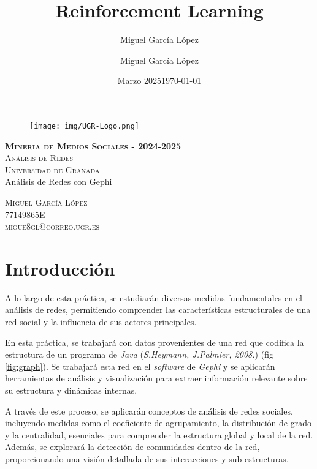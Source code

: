 \documentclass[12pt,letterpaper]{article}
\title{Reinforcement Learning}
\author{Miguel García López}
\date{Marzo 2025}
\author{Miguel García López} %
\date{\normalsize\today} %
\begin{document}
\begin{titlepage}
    \begin{figure}
        \vspace{-1.3cm}
        \begin{center}
            \texttt{[image: img/UGR-Logo.png]}
        \end{center}
    \end{figure}
    \vspace{1.3cm}
    \centering
    \normalfont \normalsize
    \textsc{\textbf{Minería de Medios Sociales - 2024-2025} \\ \vspace{.15cm} Análisis de Redes\\ \vspace{.15cm} Universidad de Granada} \\ [25pt]
    \huge Análisis de Redes con Gephi

    \normalfont \normalsize \vspace{.30cm}
    \textsc{Miguel García López} \\
    \vspace{.15cm}
    \textsc{77149865E} \\
    \vspace{.15cm}
    \textsc{migue8gl@correo.ugr.es}

\end{titlepage}

\tableofcontents
\listoffigures
\listoftables
\newpage

\section{Introducción}
A lo largo de esta práctica, se estudiarán diversas medidas fundamentales en el análisis de redes, permitiendo comprender las características estructurales de una red social y la influencia de sus actores principales.

En esta práctica, se trabajará con datos provenientes de una red que codifica la estructura de un programa de \textit{Java} (\textit{S.Heymann, J.Palmier, 2008.}) (fig \ref{fig:graph}). Se trabajará esta red en el \textit{software} de \textit{Gephi} y se aplicarán herramientas de análisis y visualización para extraer información relevante sobre su estructura y dinámicas internas.

A través de este proceso, se aplicarán conceptos de análisis de redes sociales, incluyendo medidas como el coeficiente de agrupamiento, la distribución de grado y la centralidad, esenciales para comprender la estructura global y local de la red. Además, se explorará la detección de comunidades dentro de la red, proporcionando una visión detallada de sus interacciones y sub-estructuras.
\end{document}
